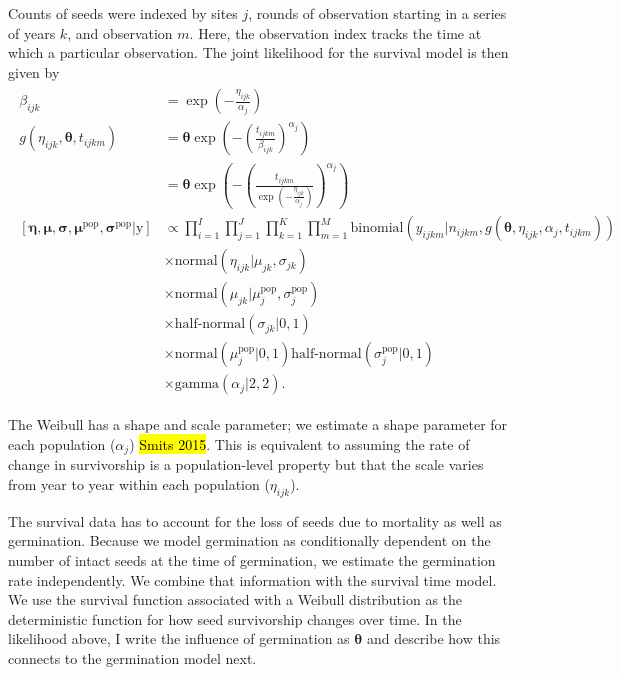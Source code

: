 \documentclass[12pt, oneside, titlepage]{article}   	%
\begin{document}
Counts of seeds were indexed by sites $j$, rounds of observation starting in a series of years $k$, and observation $m$. Here, the observation index tracks the time at which a particular observation. The joint likelihood for the survival model is then given by 
%
\begin{align}
  \begin{split}
  \beta_{ijk} & = \exp({ - \frac{ \eta_{ijk} }{ \alpha_j }})
 \\ g( \eta_{ijk}, \bm{\theta} ,  t_{ijkm} ) & = \bm{\theta}  \exp(- (\frac{ t_{ijkm} }{\beta_{ijk}})^{\alpha_j}  ) \\
  & =  \bm{\theta}  \exp(- (\frac{ t_{ijkm} }{ \exp({ - \frac{ \eta_{ijk} }{ \alpha_j}}) })^{\alpha_j}  ) 
 \\ [  \bm{\eta} , \bm{\mu} , \bm{\sigma} , \bm{\mu}^\mathrm{pop}, \bm{\sigma}^\mathrm{pop} |  \bm{\mathrm{y}}  ] &  \propto \prod_{i=1}^{I}  \prod_{j=1}^{J} \prod_{k=1}^{K} \prod_{m=1}^{M} 
   \mathrm{binomial} ( y_{ijkm} | n_{ijkm}, g( \bm{\theta} , \eta_{ijk}, \alpha_j , t_{ijkm} ) ) 
   \\ & \times \mathrm{normal} ( \eta_{ijk}  | \mu_{jk}, \sigma{_{jk} })
  \\ & \times \mathrm{normal} ( \mu_{jk}  | \mu^\mathrm{pop}_{j}, \sigma^\mathrm{pop}_{j} )
  \\ & \times \textrm{half-normal} ( \sigma_{jk} | 0,1)
  \\ & \times \mathrm{normal} ( \mu^\mathrm{pop}_{j} | 0 , 1 ) \textrm{half-normal} ( \sigma^\mathrm{pop}_{j} | 0,1)
  \\ & \times \mathrm{gamma} ( \alpha_j | 2 , 2 ).
  \end{split}
\end{align}

The Weibull has a shape and scale parameter; we estimate a shape parameter for each population ($\alpha_j$) \hl{Smits 2015}. This is equivalent to assuming the rate of change in survivorship is a population-level property but that the scale varies from year to year within each population ($\eta_{ijk}$). 

The survival data has to account for the loss of seeds due to mortality as well as germination. Because we model germination as conditionally dependent on the number of intact seeds at the time of germination, we estimate the germination rate independently. We combine that information with the survival time model. We use the survival function associated with a Weibull distribution as the deterministic function for how seed survivorship changes over time. In the likelihood above, I write the influence of germination as $\bm{\theta}$ and describe how this connects to the germination model next.
\end{document}
